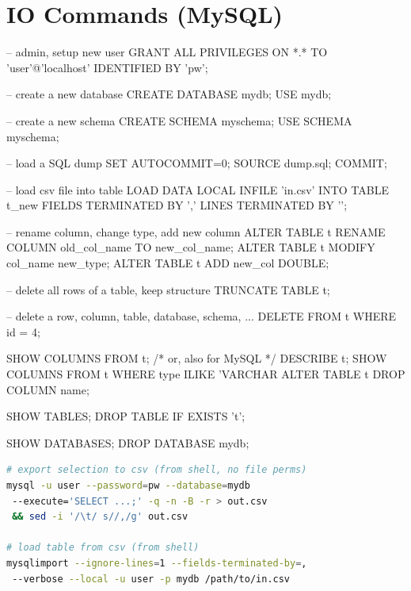 \section{IO Commands (MySQL)}
\label{sql:io}

\begin{SQLcode}
-- admin, setup new user
GRANT ALL PRIVILEGES ON *.* TO 'user'@'localhost'
	IDENTIFIED BY 'pw';

-- create a new database
CREATE DATABASE mydb; USE mydb;

-- create a new schema
CREATE SCHEMA myschema; USE SCHEMA myschema;

-- load a SQL dump
SET AUTOCOMMIT=0; SOURCE dump.sql; COMMIT;

-- load csv file into table
LOAD DATA LOCAL INFILE 'in.csv' INTO TABLE t_new
	FIELDS TERMINATED BY ',' LINES TERMINATED BY '\n';

-- rename column, change type, add new column
ALTER TABLE t RENAME COLUMN old_col_name TO new_col_name;
ALTER TABLE t MODIFY col_name new_type;
ALTER TABLE t ADD new_col DOUBLE;

-- delete all rows of a table, keep structure
TRUNCATE TABLE t;

-- delete a row, column, table, database, schema, ...
DELETE FROM t WHERE id = 4;

SHOW COLUMNS FROM t; /* or, also for MySQL */ DESCRIBE t;
SHOW COLUMNS FROM t WHERE type ILIKE 'VARCHAR%
ALTER TABLE t DROP COLUMN name;

SHOW TABLES;
DROP TABLE IF EXISTS 't';

SHOW DATABASES;
DROP DATABASE mydb;
\end{SQLcode}

\begin{lstlisting}[language=bash]
# export selection to csv (from shell, no file perms)
mysql -u user --password=pw --database=mydb
 --execute='SELECT ...;' -q -n -B -r > out.csv
 && sed -i '/\t/ s//,/g' out.csv

# load table from csv (from shell)
mysqlimport --ignore-lines=1 --fields-terminated-by=,
 --verbose --local -u user -p mydb /path/to/in.csv
\end{lstlisting}
